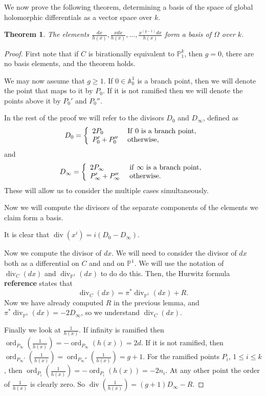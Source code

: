 \documentclass[11pt]{article} %
\newtheorem{thm}{Theorem}
\theoremstyle{remark}\newtheorem*{rem}{Remark}
\DeclareMathOperator{\ord}{ord}
\DeclareMathOperator{\di}{div}
\begin{document}
We now prove the following theorem, determining a basis of the space of global holomorphic differentials as a vector space over $k$.\\


\begin{thm}
 The elements $\frac{dx}{h(x)}, \frac{xdx}{h(x)}, \ldots , \frac{x^{(g-1)}dx}{h(x)}$ form a basis of $\Omega$ over $k$.
\end{thm}
\begin{proof}

First note that if $C$ is birationally equivalent to $\mathbb P_1^k$, then $g=0$, there are no basis elements, and the theorem holds.

We may now assume that $g\geq 1$.
If $0\in \mathbb A_k^1$ is a branch point, then we will denote the point that maps to it by $P_0$.
If it is not ramified then we will denote the points above it by $P_0'$ and $P_0''$.

In the rest of the proof we will refer to the divisors $D_0$ and $D_\infty$, defined as
\[
 D_0=\left\{ \begin{array}{ll}
             2P_0 &\ {\rm If\ 0\ is\ a\ branch\ point,}\\
             P_0'+P_0'' &\ \rm{otherwise,}
            \end{array}
\right.
\]
and
\[
 D_\infty = \left\{ \begin{array}{ll}
                     2P_\infty &\ {\rm if\ \infty\ is\ a\ branch\ point,}\\
                     P_\infty' + P_\infty'' &\ {\rm otherwise.}
                    \end{array}\right.
\]
These will allow us to consider the multiple cases simultaneously.

Now we will compute the divisors of the separate components of the elements we claim form a basis.

It is clear that $\di (x^i) = i(D_0-D_\infty)$.


Now we compute the divisor of $dx$.
We will need to consider the divisor of $dx$ both as a differential on $C$ and and on $\mathbb P^1$. 
We will use the notation of $\di_C(dx)$ and $\di_{\mathbb P^1}(dx)$ to do do this.
Then, the Hurwitz formula {\bf reference} states that
\[
 \di_C( dx) = \pi^*\di_{\mathbb P^1}(dx) + R.
\]
Now we have already computed $R$ in the previous lemma, and $\pi^*\di_{\mathbb P^1}(dx) = -2D_\infty$, so we understand $\di_C(dx)$.


Finally we look at $\frac{1}{h(x)}$.
If infinity is ramified then $\ord_{P_{\infty}}\left(\frac{1}{h(x)}\right) = -\ord_{P_{\infty}}(h(x)) = 2d$.
If it is not ramified, then $\ord_{P_{\infty}'}\left(\frac{1}{h(x)}\right) = \ord_{P_{\infty}''}\left(\frac{1}{h(x)}\right)=g+1$.
For the ramified points $P_i$, $1\leq i \leq k$, then $\ord_{P_i}\left(\frac{1}{h(x)}\right) = -\ord_{P_i}(h(x))= -2n_i$.
At any other point the order of $\frac{1}{h(x)}$ is clearly zero.
So $\di\left(\frac{1}{h(x)}\right) = (g+1)D_\infty -R$.



\end{proof}
\end{document}
